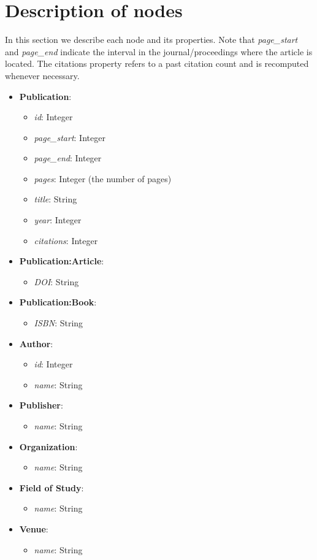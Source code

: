 \documentclass{Configuration_Files/PoliMi3i_thesis}
\begin{document}
\section{Description of nodes}
In this section we describe each node and its properties. Note that \textit{page\_start} and \textit{page\_end} indicate the interval in the journal/proceedings where the article is located. The citations property refers to a past citation count and is recomputed whenever necessary.
\begin{itemize}
    \item \textbf{Publication}:
    \begin{itemize}
        \item \textit{id}: Integer
        \item \textit{page\_start}: Integer
        \item \textit{page\_end}: Integer
        \item \textit{pages}: Integer (the number of pages)
        \item \textit{title}: String
        \item \textit{year}: Integer
        \item \textit{citations}: Integer
    \end{itemize}
    \item \textbf{Publication:Article}:
    \begin{itemize}
        \item \textit{DOI}: String 
    \end{itemize}
    \item \textbf{Publication:Book}:
    \begin{itemize}
        \item \textit{ISBN}: String
    \end{itemize}
    \item \textbf{Author}:
    \begin{itemize}
        \item \textit{id}: Integer
        \item \textit{name}: String
    \end{itemize}
    \item \textbf{Publisher}:
    \begin{itemize}
        \item \textit{name}: String
    \end{itemize}
    \item \textbf{Organization}:
    \begin{itemize}
        \item \textit{name}: String
    \end{itemize}
    \item \textbf{Field of Study}: 
    \begin{itemize}
        \item \textit{name}: String
    \end{itemize}
    \item \textbf{Venue}: 
    \begin{itemize}
        \item \textit{name}: String
    \end{itemize}
\end{itemize}
\end{document}
